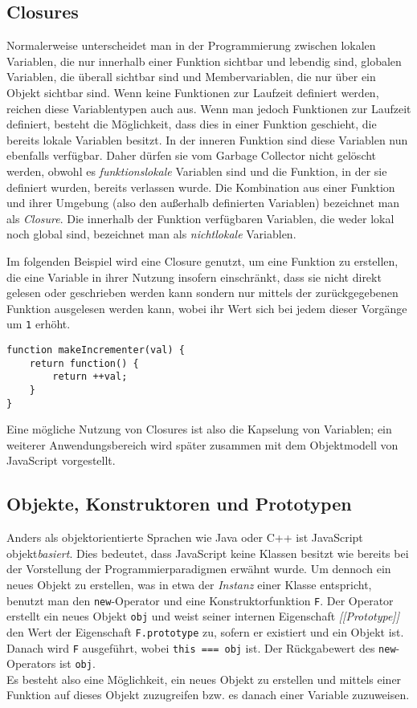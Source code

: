 \subsection{Closures}
Normalerweise unterscheidet man in der Programmierung zwischen lokalen Variablen, die nur innerhalb
einer Funktion sichtbar und lebendig sind, globalen Variablen, die überall sichtbar sind und Membervariablen, die
nur über ein Objekt sichtbar sind. Wenn keine Funktionen zur Laufzeit definiert werden, reichen
diese Variablentypen auch aus. Wenn man jedoch Funktionen zur Laufzeit definiert, besteht die
Möglichkeit, dass dies in einer Funktion geschieht, die bereits lokale Variablen besitzt. In der
inneren Funktion sind diese Variablen nun ebenfalls verfügbar. Daher dürfen sie vom Garbage
Collector nicht gelöscht werden, obwohl es \emph{funktionslokale} Variablen sind und die Funktion, in der
sie definiert wurden, bereits verlassen wurde. Die Kombination aus einer Funktion und ihrer Umgebung
(also den außerhalb definierten Variablen) bezeichnet man als \emph{Closure}. Die innerhalb der
Funktion verfügbaren Variablen, die weder lokal noch global sind, bezeichnet man als
\emph{nichtlokale} Variablen.

Im folgenden Beispiel wird eine Closure genutzt, um eine Funktion zu erstellen, die eine Variable in
ihrer Nutzung insofern einschränkt, dass sie nicht direkt gelesen oder geschrieben werden kann
sondern nur mittels der zurückgegebenen Funktion ausgelesen werden kann, wobei ihr Wert sich bei
jedem dieser Vorgänge um \lstinline{1} erhöht.

\begin{lstlisting}[caption=Beispiel für eine Closure]
function makeIncrementer(val) {
    return function() {
        return ++val;
    }
}
\end{lstlisting}

Eine mögliche Nutzung von Closures ist also die Kapselung von Variablen; ein weiterer
Anwendungsbereich wird später zusammen mit dem Objektmodell von JavaScript vorgestellt.


\subsection{Objekte, Konstruktoren und Prototypen}
Anders als objektorientierte Sprachen wie Java oder C++ ist JavaScript objekt\emph{basiert}.
Dies bedeutet, dass JavaScript keine Klassen besitzt wie bereits bei der Vorstellung der
Programmierparadigmen erwähnt wurde.
Um dennoch ein neues Objekt zu erstellen, was in etwa der \emph{Instanz} einer
Klasse entspricht, benutzt man den \lstinline{new}-Operator und eine Konstruktorfunktion
\lstinline{F}. Der Operator erstellt ein neues Objekt \lstinline{obj} und weist seiner internen
Eigenschaft \emph{[[Prototype]]} den Wert der Eigenschaft \lstinline{F.prototype} zu, sofern er
existiert und ein Objekt ist. Danach wird \lstinline{F} ausgeführt, wobei \lstinline{this === obj}
ist. Der Rückgabewert des \lstinline{new}-Operators ist \lstinline{obj}. \\
Es besteht also eine Möglichkeit, ein neues Objekt zu erstellen und mittels einer Funktion auf
dieses Objekt zuzugreifen bzw. es danach einer Variable zuzuweisen.

